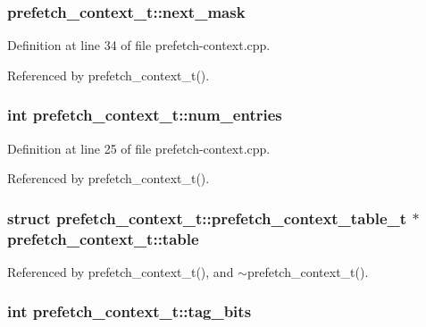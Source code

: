 \subsubsection[{next\_\-mask}]{ {\bf prefetch\_\-context\_\-t::next\_\-mask}\hspace{0.3cm}{\tt  [protected]}}\label{classprefetch__context__t_0a7b9c67ba7033dc80d823a6a51840b9}




Definition at line 34 of file prefetch-context.cpp.

Referenced by prefetch\_\-context\_\-t().
\subsubsection[{num\_\-entries}]{\setlength{\rightskip}{0pt plus 5cm}int {\bf prefetch\_\-context\_\-t::num\_\-entries}\hspace{0.3cm}{\tt  [protected]}}\label{classprefetch__context__t_95910d7d84b697a5e2ed6a7fcf03f3e5}




Definition at line 25 of file prefetch-context.cpp.

Referenced by prefetch\_\-context\_\-t().
\subsubsection[{table}]{\setlength{\rightskip}{0pt plus 5cm}struct {\bf prefetch\_\-context\_\-t::prefetch\_\-context\_\-table\_\-t} $\ast$  {\bf prefetch\_\-context\_\-t::table}\hspace{0.3cm}{\tt  [protected]}}\label{classprefetch__context__t_1aaf08df91883c1208a7ffc3f83b8f12}




Referenced by prefetch\_\-context\_\-t(), and $\sim$prefetch\_\-context\_\-t().
\subsubsection[{tag\_\-bits}]{\setlength{\rightskip}{0pt plus 5cm}int {\bf prefetch\_\-context\_\-t::tag\_\-bits}\hspace{0.3cm}{\tt  [protected]}}\label{classprefetch__context__t_d6488174643788fb51b5646439ab3a3d}




